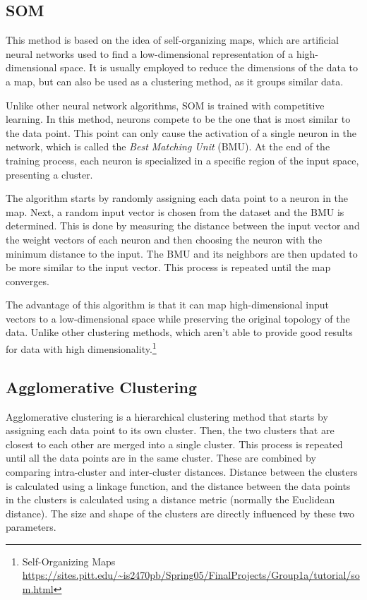 \subsection{SOM}\label{sec:som}
This method is based on the idea of self-organizing maps, which are artificial neural networks used to find a low-dimensional representation of a high-dimensional space. It is usually employed to reduce the dimensions of the data to a map, but can also be used as a clustering method, as it groups similar data. 

Unlike other neural network algorithms, SOM is trained with competitive learning. In this method, neurons compete to be the one that is most similar to the data point. This point can only cause the activation of a single neuron in the network, which is called the \textit{Best Matching Unit} (BMU). At the end of the training process, each neuron is specialized in a specific region of the input space, presenting a cluster.

The algorithm starts by randomly assigning each data point to a neuron in the map. Next, a random input vector is chosen from the dataset and the BMU is determined. This is done by measuring the distance between the input vector and the weight vectors of each neuron and then choosing the neuron with the minimum distance to the input. The BMU and its neighbors are then updated to be more similar to the input vector. This process is repeated until the map converges. 


The advantage of this algorithm is that it can map high-dimensional input vectors to a low-dimensional space while preserving the original topology of the data. Unlike other clustering methods, which aren't able to provide good results for data with high dimensionality.\footnote{Self-Organizing Maps \url{https://sites.pitt.edu/~is2470pb/Spring05/FinalProjects/Group1a/tutorial/som.html}}

\subsection{Agglomerative Clustering}\label{sec:aglomerative}
Agglomerative clustering is a hierarchical clustering method that starts by assigning each data point to its own cluster. Then, the two clusters that are closest to each other are merged into a single cluster. This process is repeated until all the data points are in the same cluster. These are combined by comparing intra-cluster and inter-cluster distances. Distance between the clusters is calculated using a linkage function, and the distance between the data points in the clusters is calculated using a distance metric (normally the Euclidean distance). The size and shape of the clusters are directly influenced by these two parameters.

